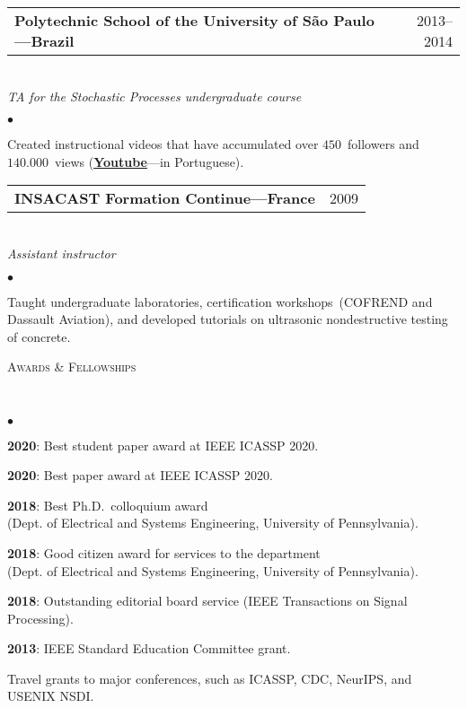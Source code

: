 \documentclass[a4paper,11pt]{article}
\makeatletter
\newcommand{\CVheading}[1]{
	\vspace{10pt}
	{ \large
	\begin{minipage}{\textwidth}
		\textsc{#1 \vphantom{p\^{E}}}
	\end{minipage} } \\
	\vspace{5pt}
}
\newcommand{\CVsubheading}[2]{
	\begin{tabular*}{\textwidth}{l@{\extracolsep{\fill}}r}
		\textbf{#1} & #2 \\
	\end{tabular*} \\
}
\newcommand{\CVlist}{
	\begin{list}{$\bullet$}{
	\setlength{\itemsep}{0pt}
	\setlength{\parsep}{1pt}
	\setlength{\topsep}{1pt}
	\setlength{\partopsep}{0pt}
	\setlength{\leftmargin}{24pt}
	\setlength{\labelwidth}{1em} }
}
\newcommand{\CVlistend}{
	\end{list}
	\vspace{3pt}
}
\makeatother
\begin{document}
\CVsubheading{Polytechnic School of the University of São Paulo---Brazil}{2013--2014}
\textit{TA for the Stochastic Processes undergraduate course}

	\CVlist

	\item Created instructional videos that have accumulated over $450$~followers and $140.000$~views (\href{https://www.youtube.com/channel/UC6LuNe5OPNiggEBcaI6UrRA}{\textbf{Youtube}}---in Portuguese).

	\CVlistend


\CVsubheading{INSACAST Formation Continue---France}{2009}
\textit{Assistant instructor}

	\CVlist

	\item Taught undergraduate laboratories, certification workshops~(COFREND and Dassault Aviation), and developed tutorials on ultrasonic nondestructive testing of concrete.

	\CVlistend





\CVheading{Awards \& Fellowships}

	\CVlist

	\item \textbf{2020}: Best student paper award at IEEE ICASSP 2020.

	\item \textbf{2020}: Best paper award at IEEE ICASSP 2020.

	\item \textbf{2018}: Best Ph.D.\ colloquium award\\(Dept. of Electrical and Systems Engineering, University of Pennsylvania).

	\item \textbf{2018}: Good citizen award for services to the department\\(Dept. of Electrical and Systems Engineering, University of Pennsylvania).

	\item \textbf{2018}: Outstanding editorial board service (IEEE Transactions on Signal Processing).

	\item \textbf{2013}: IEEE Standard Education Committee grant.

	\item Travel grants to major conferences, such as ICASSP, CDC, NeurIPS, and USENIX NSDI.

	\CVlistend
\end{document}
